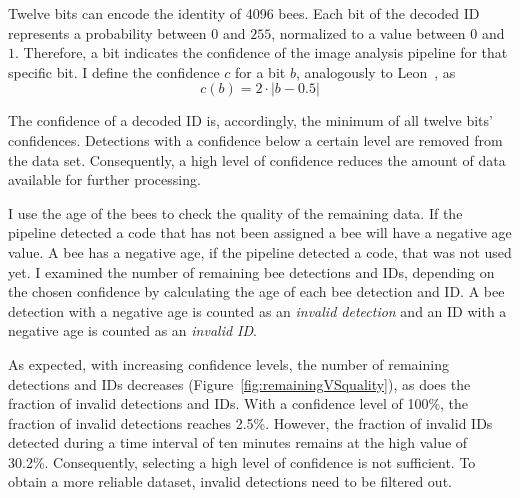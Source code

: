 \footnotetext{}

Twelve bits can encode the identity of 4096 bees.
Each bit of the decoded ID represents a probability between $0$ and $255$, normalized to a value between $0$ and $1$.
Therefore, a bit indicates the confidence of the image analysis pipeline for that specific bit.
I define the confidence $c$ for a bit $b$, analogously to Leon~\textcite[p.~14]{leon2016}, as
\begin{equation}
\label{eq:confidence}
c(b)=2\cdot|b-0.5|
\end{equation}

The confidence of a decoded ID is, accordingly, the minimum of all twelve bits' confidences.
Detections with a confidence below a certain level are removed from the data set.
Consequently, a high level of confidence reduces the amount of data available for further processing.

I use the age of the bees to check the quality of the remaining data.
If the pipeline detected a code that has not been assigned a bee will have a negative age value.
A bee has a negative age, if the pipeline detected a code, that was not used yet.
I examined the number of remaining bee detections and IDs, depending on the chosen confidence by calculating the age of each bee detection and ID.
A bee detection with a negative age is counted as an \emph{invalid detection} and an ID with a negative age is counted as an \emph{invalid ID}.

As expected, with increasing confidence levels, the number of remaining detections and IDs decreases (Figure~\ref{fig:remainingVSquality}), as does the fraction of invalid detections and IDs.
With a confidence level of 100\%, the fraction of invalid detections reaches 2.5\%.
However, the fraction of invalid IDs detected during a time interval of ten minutes remains at the high value of 30.2\%. Consequently, selecting a high level of confidence is not sufficient.
To obtain a more reliable dataset, invalid detections need to be filtered out.

